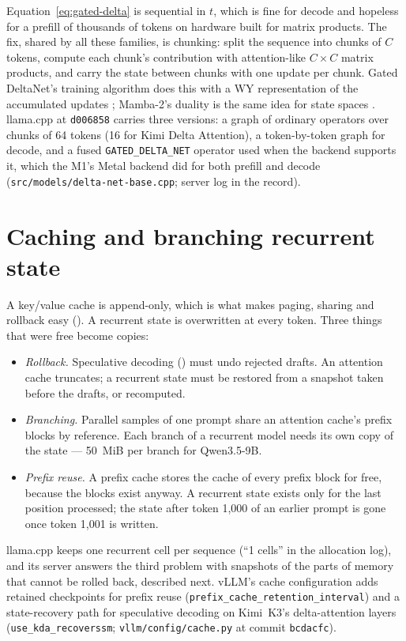 Equation~\eqref{eq:gated-delta} is sequential in $t$, which is fine for decode
and hopeless for a prefill of thousands of tokens on hardware built for matrix
products. The fix, shared by all these families, is chunking: split the
sequence into chunks of $C$ tokens, compute each chunk's contribution with
attention-like $C \times C$ matrix products, and carry the state between
chunks with one update per chunk. Gated DeltaNet's training algorithm does this
with a WY representation of the accumulated updates \cite{yang2025gateddeltanet};
Mamba-2's duality is the same idea for state spaces \cite{dao2024mamba2}.
llama.cpp at \texttt{d006858} carries three versions: a graph of ordinary
operators over chunks of 64 tokens (16 for Kimi Delta Attention), a
token-by-token graph for decode, and a fused \texttt{GATED\_DELTA\_NET} operator
used when the backend supports it, which the M1's Metal backend did for both
prefill and decode (\texttt{src/models/delta-net-base.cpp}; server log in the
record).

\section{Caching and branching recurrent state}

A key/value cache is append-only, which is what makes paging, sharing and
rollback easy (). A recurrent state is overwritten at every
token. Three things that were free become copies:

\begin{itemize}
\item \emph{Rollback.} Speculative decoding () must
  undo rejected drafts. An attention cache truncates; a recurrent state must be
  restored from a snapshot taken before the drafts, or recomputed.
\item \emph{Branching.} Parallel samples of one prompt share an attention
  cache's prefix blocks by reference. Each branch of a recurrent model needs
  its own copy of the state --- 50~MiB per branch for Qwen3.5-9B.
\item \emph{Prefix reuse.} A prefix cache stores the cache of every prefix
  block for free, because the blocks exist anyway. A recurrent state exists
  only for the last position processed; the state after token 1,000 of an
  earlier prompt is gone once token 1,001 is written.
\end{itemize}

llama.cpp keeps one recurrent cell per sequence (``1 cells'' in the allocation
log), and its server answers the third problem with snapshots of the parts of
memory that cannot be rolled back, described next. vLLM's cache configuration
adds retained checkpoints for prefix reuse
(\texttt{prefix\_cache\_retention\_interval}) and a state-recovery path for
speculative decoding on Kimi~K3's delta-attention layers
(\texttt{use\_kda\_recoverssm}; \texttt{vllm/config/cache.py} at commit
\texttt{bcdacfc}).

